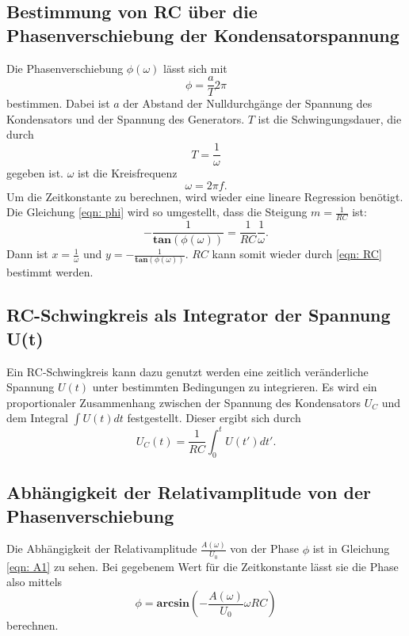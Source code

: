 \subsection{Bestimmung von RC über die Phasenverschiebung der Kondensatorspannung}
Die Phasenverschiebung $\phi(\omega)$ lässt sich mit
\begin{equation}
    \phi = \frac{a}{T}2\pi
\end{equation}
bestimmen. Dabei ist $a$ der Abstand der Nulldurchgänge der Spannung des Kondensators und der Spannung des Generators.
$T$ ist die Schwingungsdauer, die durch
\begin{equation*}
    T = \frac{1}{\omega}
\end{equation*}
gegeben ist. $\omega$ ist die Kreisfrequenz
\begin{equation*}
    \omega = 2\pi f.
\end{equation*}
Um die Zeitkonstante zu berechnen, wird wieder eine lineare Regression benötigt.
Die Gleichung \eqref{eqn: phi} wird so umgestellt, dass die Steigung $m = \frac{1}{RC}$ ist:
\begin{equation}
    -\frac{1}{\mathbf{tan}(\phi(\omega))} = \frac{1}{RC} \frac{1}{\omega}.
    \label{eqn: linreg3} 
\end{equation}
Dann ist $x= \frac{1}{\omega}$ und $y= -\frac{1}{\mathbf{tan}(\phi(\omega))}$.
$RC$ kann somit wieder durch \eqref{eqn: RC} bestimmt werden.

\subsection{RC-Schwingkreis als Integrator der Spannung U(t)}
Ein RC-Schwingkreis kann dazu genutzt werden eine zeitlich veränderliche Spannung $U(t)$ unter bestimmten Bedingungen zu integrieren. 
Es wird ein proportionaler Zusammenhang zwischen der Spannung des Kondensators $U_{C}$ und dem Integral $\int U(t) dt$ festgestellt. Dieser ergibt sich durch 
\begin{equation}
    U_{C}(t) = \frac{1}{RC} \int_{0}^{t} U(t') dt'.
\end{equation}

\subsection{Abhängigkeit der Relativamplitude von der Phasenverschiebung}
Die Abhängigkeit der Relativamplitude $\frac{A(\omega)}{U_{0}}$ von der Phase $\phi$ ist in
Gleichung \eqref{eqn: A1} zu sehen.
Bei gegebenem Wert für die Zeitkonstante lässt sie die Phase also mittels
\begin{equation}
    \phi = \mathbf{arcsin}(- \frac{A(\omega)}{U_{0}} \omega RC) %
    \label{eqn: phi2}
\end{equation}
berechnen.
